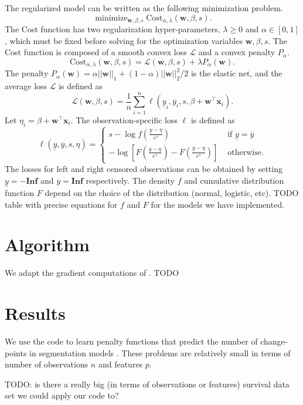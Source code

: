 \documentclass[article]{jss}
\newcommand{\Cost}{\text{Cost}}
\DeclareMathOperator*{\minimize}{minimize}
\begin{document}
The regularized model can be written as the following minimization
problem. 
\begin{equation}
  \label{eq:min_cost}
  \minimize_{
    \mathbf w,
    \beta,
    s
  }
  \Cost_{\alpha,\lambda}(\mathbf w, \beta, s).
\end{equation}
The Cost function has two regularization hyper-parameters,
$\lambda\geq 0$ and $\alpha\in[0,1]$, which must be fixed before
solving for the optimization variables $\mathbf w, \beta, s$. The Cost
function is composed of a smooth convex loss $\mathcal L$ and a convex
penalty $P_\alpha$.
\begin{equation}
  \label{eq:Cost_loss_pen}
  \Cost_{\alpha,\lambda}(\mathbf w, \beta, s) =
  \mathcal L(\mathbf w, \beta, s) +
  \lambda P_\alpha(\mathbf w).
\end{equation}
The penalty
$P_\alpha(\mathbf w)=\alpha||\mathbf w||_1 + (1-\alpha)||\mathbf
w||_2^2/2$ is the elastic net, and the average loss $\mathcal L$ is defined as
\begin{equation}
  \label{eq:Loss}
  \mathcal L(\mathbf w, \beta, s) = 
  \frac 1 n \sum_{i=1}^n \ell(
  \underline y_i, 
  \overline y_i,
  s,
  \beta + \mathbf w^\intercal \mathbf x_i).
\end{equation}
Let $\eta_i = \beta + \mathbf w^\intercal \mathbf x_i$.  The observation-specific loss $\ell$ is defined as
\begin{equation}
  \label{eq:ell}
\ell(
  \underline y, 
  \overline y,
  s,
  \eta
)=
\begin{cases}
  s-\log f\left(\frac{\underline y - \eta}{e^s}\right) &
  \text{ if } \underline y = \overline y\\
  -\log\left[
    F\left(\frac{\overline y-\eta}{e^s}\right)-
    F\left(\frac{\underline y-\eta}{e^s}\right)
  \right] & \text{ otherwise.}
\end{cases}
\end{equation}
The losses for left and right censored observations can be obtained by setting
$\underline y = \mathbf {-Inf}$ and $\overline y = \mathbf {Inf}$ respectively.
The density $f$ and cumulative distribution function $F$ depend on the
choice of the distribution (normal, logistic, etc). TODO table with
precise equations for $f$ and $F$ for the models we have implemented.

\section{Algorithm}

We adapt the gradient computations of \citet{survival-manual}. TODO

\section{Results}

We use the code to learn penalty functions that predict the number of
change-points in segmentation models \citep{HOCKING-penalties,
  PeakSeg}. These problems are relatively small in terms of number of
observations $n$ and features $p$.

TODO: is there a really big (in terms of observations or features)
survival data set we could apply our code to?


\end{document}
